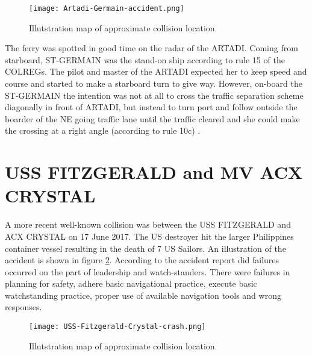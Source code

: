 \begin{figure}[H]
	\centering
	\texttt{[image: Artadi-Germain-accident.png]}
	\caption{Illutstration map of approximate collision location}
	\label{fig:Artadi-Germain}
\end{figure}

The ferry was spotted in good time on the radar of the ARTADI. Coming from  starboard, ST-GERMAIN was the stand-on ship according to rule 15 of the \ac{COLREGs}. The pilot and master of the ARTADI expected her to keep speed and course and started to make a starboard turn to give way. However, on-board the ST-GERMAIN the intention was not at all to cross the traffic separation scheme diagonally in front of ARTADI, but instead to turn port and follow outside the boarder of the NE going traffic lane until the traffic cleared and she could make the crossing at a right angle (according to rule 10c) \cite{Porathe2013}.

\newpage
\section{USS FITZGERALD and MV ACX CRYSTAL}
A more recent well-known collision was between the USS FITZGERALD and ACX CRYSTAL on 17 June 2017. The US destroyer hit the larger Philippines container vessel resulting in the death of 7 US Sailors. An illustration of the accident is shown in figure \ref{fig:Accident-USS-Fitzgerald-Crystal}. According to the accident report did failures occurred on the part of leadership and watch-standers. There were failures in planning for safety, adhere basic navigational practice, execute basic watchstanding practice, proper use of available navigation tools and wrong responses.

\begin{figure}[H]
	\centering
	\texttt{[image: USS-Fitzgerald-Crystal-crash.png]}
	\caption{Illutstration map of approximate collision location}
	\label{fig:Accident-USS-Fitzgerald-Crystal}
\end{figure}

